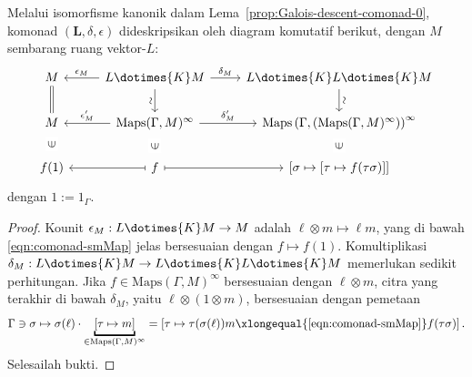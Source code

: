 \begin{lemma}\label{prop:Galois-descent-comonad-1}
	Melalui isomorfisme kanonik dalam
	Lema~\ref{prop:Galois-descent-comonad-0}, komonad
	$(\mathbf{L},\delta,\epsilon)$ dideskripsikan oleh diagram komutatif
	berikut, dengan $M$ sembarang ruang vektor-$L$:
	\[\begin{tikzcd}
		M \arrow[equal, d] & L \dotimes{K} M \arrow[r, "{\delta_M}"] \arrow[d, "\sim"', sloped] \arrow[l, "{\epsilon_M}"'] & L \dotimes{K} L \dotimes{K} M \arrow[d, "\sim", sloped] \\
		M & \mathrm{Maps}(\Gamma, M)^\infty \arrow[r, "{\delta'_M}"] \arrow[l, "{\epsilon'_M}"'] & \mathrm{Maps}\left(\Gamma, (\mathrm{Maps}(\Gamma, M)^\infty )\right)^\infty \\
		f(1) \arrow[phantom, u, "\in" description, sloped] & f \arrow[mapsto, r] \arrow[phantom, u, "\in" description, sloped] \arrow[mapsto, l] & {[\sigma \mapsto [\tau \mapsto f(\tau\sigma) ]]} \arrow[phantom, u, "\in" description, sloped]
	\end{tikzcd}\]
	dengan $1:=1_\Gamma$.
\end{lemma}
\begin{proof}
	Kounit $\epsilon_M:L\dotimes{K}M\to M$ adalah
	$\ell\otimes m\mapsto\ell m$, yang di bawah
	\eqref{eqn:comonad-smMap} jelas bersesuaian dengan $f\mapsto f(1)$.
	Komultiplikasi
	$\delta_M:L\dotimes{K}M\to L\dotimes{K}L\dotimes{K}M$ memerlukan sedikit
	perhitungan. Jika $f\in\mathrm{Maps}(\Gamma,M)^\infty$ bersesuaian dengan
	$\ell\otimes m$, citra yang terakhir di bawah $\delta_M$, yaitu
	$\ell\otimes(1\otimes m)$, bersesuaian dengan pemetaan
	\[ \Gamma \ni \sigma \mapsto \sigma(\ell)  \cdot \underbracket{\left[ \tau \mapsto m  \right]}_{\in \mathrm{Maps}(\Gamma, M)^\infty} = \left[ \tau \mapsto \tau(\sigma(\ell))m \xlongequal{\text{\eqref{eqn:comonad-smMap}}} f(\tau\sigma) \right]. \]
	Selesailah bukti.
\end{proof}

